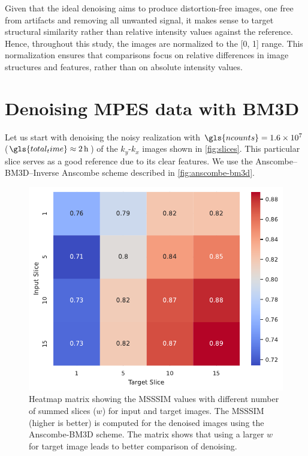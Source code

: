 Given that the ideal denoising aims to produce distortion-free images, one free from artifacts and removing all unwanted signal, it makes sense to target structural similarity rather than relative intensity values against the reference. Hence, throughout this study, the images are normalized to the [\num{0}, \num{1}] range. This normalization ensures that comparisons focus on relative differences in image structures and features, rather than on absolute intensity values.

\section{Denoising MPES data with BM3D}
Let us start with  denoising the noisy realization with $\gls{ncounts}=\num{1.6e7}$ ($\gls{total_time}\approx\qty{2}{h}$) of the $k_y$-$k_x$ images shown in \cref{fig:slices}. This particular slice serves as a good reference due to its clear features. We use the Anscombe--\gls{BM3D}--Inverse Anscombe scheme described in \cref{fig:anscombe-bm3d}. 


\begin{figure}
    \centering
    \includegraphics[width=0.5\linewidth]{images/confusion_matrix_msssim_window_avg.pdf}
    \caption{Heatmap matrix  showing the \gls{MSSSIM} values with different number of summed slices ($w$) for input and target images. The \gls{MSSSIM} (higher is better) is computed for the denoised images using the Anscombe-BM3D scheme. The matrix shows that using a larger $w$ for target image leads to better comparison of denoising.}
    \label{fig:confusion_matrix_msssim_window_avg}
\end{figure}

